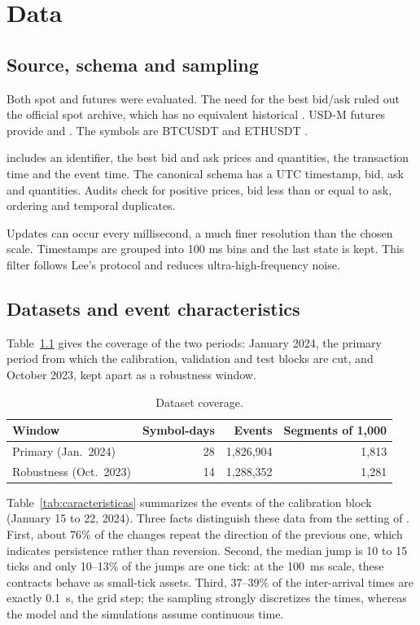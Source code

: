 \chapter{Data}
\label{cap:dados}

\section{Source, schema and sampling}

Both spot and futures were evaluated. The need for the best bid/ask ruled out the
official spot archive, which has no equivalent historical . USD-M
futures provide  and . The symbols are BTCUSDT
and ETHUSDT \citep{binancePublicData}.

 includes an identifier, the best bid and ask prices and
quantities, the transaction time and the event time. The canonical schema has a UTC
timestamp, bid, ask and quantities. Audits check for positive prices, bid less than
or equal to ask, ordering and temporal duplicates.

Updates can occur every millisecond, a much finer resolution than the chosen scale.
Timestamps are grouped into 100 ms bins and the last state is kept. This filter
follows Lee's protocol and reduces ultra-high-frequency noise.

\section{Datasets and event characteristics}
\label{sec:caracteristicas}

Table~\ref{tab:cobertura} gives the coverage of the two periods: January 2024, the primary
period from which the calibration, validation and test blocks are cut, and October 2023, kept
apart as a robustness window.

\begin{table}[htbp]
\centering
\caption{Dataset coverage.}
\label{tab:cobertura}
\begin{tabular}{lrrr}
\toprule
Window & Symbol-days & Events & Segments of 1,000\\
\midrule
Primary (Jan.\ 2024) & 28 & 1,826,904 & 1,813\\
Robustness (Oct.\ 2023) & 14 & 1,288,352 & 1,281\\
\bottomrule
\end{tabular}
\end{table}

Table~\ref{tab:caracteristicas} summarizes the events of the calibration block
(January 15 to 22, 2024). Three facts distinguish these data from the setting of
\citet{lee2023}. First, about 76\% of the changes repeat the direction of the previous
one, which indicates persistence rather than reversion. Second, the median jump is 10
to 15 ticks and only 10--13\% of the jumps are one tick: at the 100~ms scale, these
contracts behave as small-tick assets. Third, 37--39\% of the inter-arrival times are
exactly 0.1~s, the grid step; the sampling strongly discretizes the times, whereas the
model and the simulations assume continuous time.

